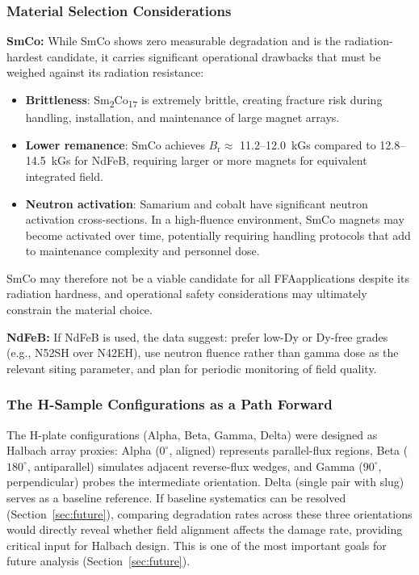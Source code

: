 \documentclass[11pt,letterpaper]{article}
\newcommand{\SmCo}{Sm\textsubscript{2}Co\textsubscript{17}}
\newcommand{\Br}{B_\mathrm{r}}
\newcommand{\FFA}{FFA}
\begin{document}
\subsubsection{Material Selection Considerations}

\textbf{SmCo:} While SmCo shows zero measurable degradation and is the
radiation-hardest candidate, it carries significant operational drawbacks
that must be weighed against its radiation resistance:
\begin{itemize}
    \item \textbf{Brittleness}: \SmCo{} is extremely brittle, creating
    fracture risk during handling, installation, and maintenance of large
    magnet arrays.
    \item \textbf{Lower remanence}: SmCo achieves $\Br \approx$
    11.2--\SI{12.0}{kGs} compared to 12.8--\SI{14.5}{kGs} for NdFeB,
    requiring larger or more magnets for equivalent integrated field.
    \item \textbf{Neutron activation}: Samarium and cobalt have significant
    neutron activation cross-sections. In a high-fluence environment, SmCo
    magnets may become activated over time, potentially requiring handling
    protocols that add to maintenance complexity and personnel dose.
\end{itemize}
SmCo may therefore not be a viable candidate for all \FFA applications
despite its radiation hardness, and operational safety considerations
may ultimately constrain the material choice.

\textbf{NdFeB:} If NdFeB is used, the data suggest: prefer low-Dy or
Dy-free grades (e.g., N52SH over N42EH), use neutron fluence rather than
gamma dose as the relevant siting parameter, and plan for periodic
monitoring of field quality.

\subsubsection{The H-Sample Configurations as a Path Forward}

The H-plate configurations (Alpha, Beta, Gamma, Delta) were designed as
Halbach array proxies: Alpha ($0^\circ$, aligned) represents parallel-flux
regions, Beta ($180^\circ$, antiparallel) simulates adjacent reverse-flux
wedges, and Gamma ($90^\circ$, perpendicular) probes the intermediate
orientation. Delta (single pair with slug) serves as a baseline reference.
If baseline systematics can be resolved (Section~\ref{sec:future}),
comparing degradation rates across these three orientations would directly
reveal whether field alignment affects the damage rate, providing critical
input for Halbach design. This is one of the most important goals for
future analysis (Section~\ref{sec:future}).
\end{document}
